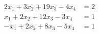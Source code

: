 %
\begin{align*}
2x_1+ 3x_2+19x_3 -4x_4&=2\\
x_1+ 2x_2+ 12x_3-3x_4&=1\\
-x_1+ 2x_2+ 8x_3-5x_4&=1
\end{align*}
%
